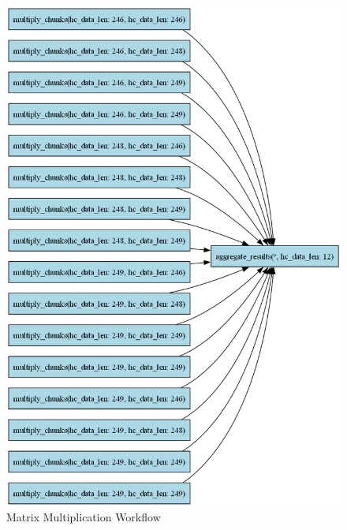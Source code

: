\documentclass[conference]{IEEEtran}
\begin{document}
\begin{figure}[h]
    \centering
    \includegraphics[width=\linewidth, height=0.85\textheight]{figures/dag_image_gemm.png}
    \caption{Matrix Multiplication Workflow}
    \label{fig:matrix_multiplication}
\end{figure}
\end{document}
